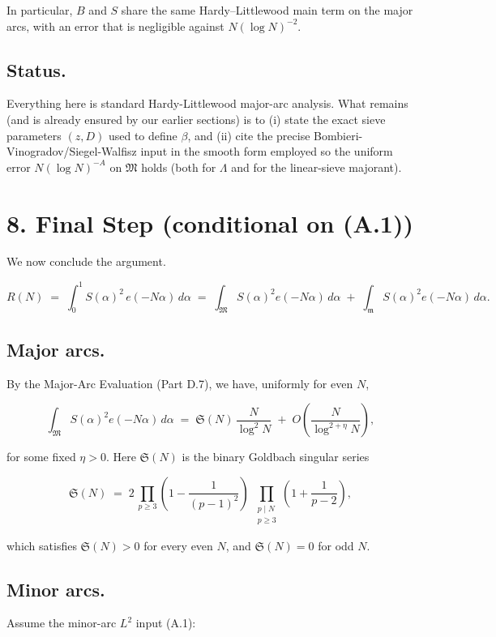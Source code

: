 \documentclass[11pt]{article}
\theoremstyle{definition}
\theoremstyle{remark}
\begin{document}
In particular, $B$ and $S$ share the same Hardy–Littlewood main term on the major arcs, with an error that is negligible against $N(\log N)^{-2}$.

\subsection*{Status.}
Everything here is standard Hardy-Littlewood major-arc analysis. What remains (and is already ensured by our earlier sections) is to (i) state the exact sieve parameters $(z,D)$ used to define $\beta$, and (ii) cite the precise Bombieri-Vinogradov/Siegel-Walfisz input in the smooth form employed so the uniform error $N(\log N)^{-A}$ on $\mathfrak M$ holds (both for $\Lambda$ and for the linear-sieve majorant).
\section*{8. Final Step (conditional on (A.1))}

We now conclude the argument.

$$
	R(N)\;=\;\int_0^1 S(\alpha)^2\,e(-N\alpha)\,d\alpha
	\;=\;\int_{\mathfrak M} S(\alpha)^2 e(-N\alpha)\,d\alpha
	\;+\;\int_{\mathfrak m} S(\alpha)^2 e(-N\alpha)\,d\alpha.
$$

\subsection*{Major arcs.}

By the Major-Arc Evaluation (Part D.7), we have, uniformly for even $N$,

$$
	\int_{\mathfrak M} S(\alpha)^2 e(-N\alpha)\,d\alpha
	\;=\;\mathfrak S(N)\,\frac{N}{\log^2 N}\;+\;O\!\left(\frac{N}{\log^{2+\eta}N}\right),
$$

for some fixed $\eta>0$. Here $\mathfrak S(N)$ is the binary Goldbach singular series

$$
	\mathfrak S(N)
	\;=\;2\,\prod_{p\ge 3}\!\left(1-\frac{1}{(p-1)^2}\right)
	\;\prod_{\substack{p\mid N\\ p\ge 3}}\!\!\left(1+\frac{1}{p-2}\right),
$$

which satisfies $\mathfrak S(N)>0$ for every even $N$, and $\mathfrak S(N)=0$ for odd $N$.

\subsection*{Minor arcs.}

Assume the minor-arc $L^2$ input (A.1):
\end{document}
